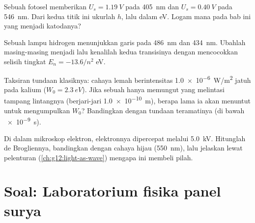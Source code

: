 \begin{exercise}[$\star\star\star$]\label{exo:g12:quantum-world:12}
Sebuah fotosel memberikan $U_s = \qty{1.19}{V}$ pada \qty{405}{nm} dan $U_s =
\qty{0.40}{V}$ pada \qty{546}{nm}. Dari kedua titik ini ukurlah $h$, lalu
 dalam \unit{eV}. Logam mana pada bab ini yang menjadi katodanya?
\end{exercise}

\begin{exercise}[$\star\star\star$]\label{exo:g12:quantum-world:13}
Sebuah lampu hidrogen menunjukkan garis pada \qty{486}{nm} dan \qty{434}{nm}. Ubahlah
masing-masing menjadi   lalu kenalilah kedua transisinya dengan mencocokkan
selisih tingkat $E_n = -13.6/n^2$ \unit{eV}.
\end{exercise}

\begin{exercise}[$\star\star\star$]\label{exo:g12:quantum-world:14}
Taksiran tundaan klasiknya: cahaya lemah berintensitas \qty{1.0e-6}{W/m^2}
jatuh pada kalium ($W_0 = \qty{2.3}{eV}$). Jika sebuah  hanya memungut
 yang melintasi tampang lintangnya (berjari-jari \qty{1.0e-10}{m}), berapa lama
ia akan menuntut untuk mengumpulkan $W_0$? Bandingkan dengan tundaan teramatinya (di bawah \qty{e-9}{s}).
\end{exercise}

\begin{exercise}[$\star\star\star$]\label{exo:g12:quantum-world:15}
Di dalam mikroskop elektron, elektronnya dipercepat melalui \qty{5.0}{kV}.
Hitunglah  de Brogliennya, bandingkan dengan cahaya hijau (\qty{550}{nm}),
lalu jelaskan lewat pelenturan (\cref{ch:g12:light-as-wave}) mengapa ini membeli  pilah.
\end{exercise}

\section{Soal: Laboratorium fisika panel surya}

